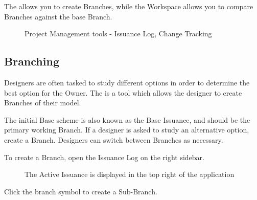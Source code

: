 \documentclass[letterpaper,10pt,english]{sphinxmanual}
\begin{document}
The {\hyperref[\detokenize{docs/userguide/projectmanagement/issuancelog/index-issuance_log:issuance-log}]{}} allows you to create Branches, while the {\hyperref[\detokenize{docs/userguide/projectmanagement/changetracking/index-change_tracking:change-tracking}]{}} Workspace allows you to compare Branches against the base Branch.

\begin{figure}[H]
\centering
\capstart

\noindent{}
\caption{Project Management tools - Issuance Log, Change Tracking}\label{\detokenize{docs/userguide/index-user_guide:id29}}\end{figure}


\subsection{Branching}
\label{\detokenize{docs/userguide/projectmanagement/issuancelog/index-issuance_log:branching}}\label{\detokenize{docs/userguide/projectmanagement/issuancelog/index-issuance_log:issuance-log}}\label{\detokenize{docs/userguide/projectmanagement/issuancelog/index-issuance_log::doc}}
Designers are often tasked to study different options in order to determine the best option for the Owner.  The {\hyperref[\detokenize{docs/userguide/projectmanagement/issuancelog/index-issuance_log:issuance-log}]{}} is a tool which allows the designer to create Branches of their model.

The initial Base scheme is also known as the Base Issuance, and should be the primary working Branch.  If a designer is asked to study an alternative option, create a Branch.  Designers can switch between Branches as necessary.

To create a Branch, open the Issuance Log on the right sidebar.

\begin{figure}[H]
\centering
\capstart

\noindent{}
\caption{The Active Issuance is displayed in the top right of the application}\label{\detokenize{docs/userguide/projectmanagement/issuancelog/index-issuance_log:id1}}\end{figure}

Click the branch symbol to create a Sub-Branch.
\end{document}
